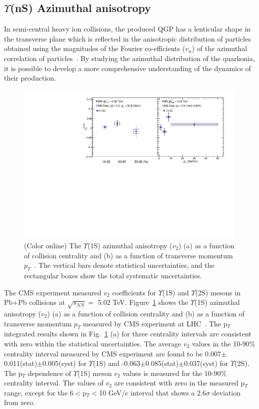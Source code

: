     
    
\subsection{$\Upsilon$(nS) Azimuthal anisotropy}


In semi-central heavy ion collisions,
the produced QGP has a lenticular shape in the transverse plane
which is reflected in the anisotropic
distribution of particles obtained using the magnitudes
of the Fourier co-efficients ($v_{n}$) of the azimuthal correlation of
particles~\cite{Voloshin:1994mz}. By studying the azimuthal distribution of
the quarkonia, it is possible to develop a more comprehensive understanding
of the dynamics of their production.

\begin{figure}
\includegraphics[width=0.99\textwidth]{Figures/Fig10_CMS_Y1S_5TeV_V2.pdf}
\caption{(Color online) The $\Upsilon$(1S) azimuthal anisotropy ($v_{2}$) (a) as a
  function of collision centrality and (b) as a function of transverse momentum
  $p_{T}$~\cite{CMS:2020efs}. The vertical bars denote statistical uncertainties,
  and the rectangular boxes show the total systematic uncertainties.
}
\label{fig:Upsilon1SV2CMS}
\end{figure}



The CMS experiment measured $v_{2}$ coefficients for $\Upsilon$(1S) and $\Upsilon$(2S)
mesons in Pb+Pb collisions at $\sqrt{s_{NN}}=$ 5.02 TeV.
Figure~\ref{fig:Upsilon1SV2CMS} shows the $\Upsilon$(1S) azimuthal
anisotropy ($v_{2}$) (a) as a function of collision centrality and (b) as a
function of transverse momentum $p_{T}$ measured by CMS experiment at
LHC~\cite{CMS:2020efs}. The p$_{T}$ integrated results shown in
Fig.~\ref{fig:Upsilon1SV2CMS} (a) for three centrality intervals are consistent
with zero within the statistical uncertainties. The average $v_{2}$ values in the
10-90$\%$ centrality interval measured by CMS experiment are found to
be 0.007$\pm$0.011(stat)$\pm$0.005(syst) for $\Upsilon$(1S) and
-0.063$\pm$0.085(stat)$\pm$0.037(syst) for $\Upsilon$(2S).   
The p$_{T}$ dependence of $\Upsilon$(1S) meson $v_{2}$ values is measured
for the 10-90$\%$ centrality interval. The values of $v_{2}$ are consistent with
zero in the measured p$_T$ range, except for the 6$<$p$_T$$<$10 GeV/c interval that
shows a 2.6$\sigma$ deviation from zero. 

